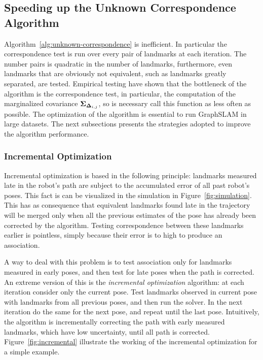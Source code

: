 \subsection{Speeding up the Unknown Correspondence Algorithm}

Algorithm~\ref{alg:unknown-correspondence} is inefficient. In particular the correspondence test is run over every pair of landmarks at each iteration. The number pairs is quadratic in the number of landmarks, furthermore, even landmarks that are obviously not equivalent, such as landmarks greatly separated, are tested. Empirical testing have shown that the bottleneck of the algorithm is the correspondence test, in particular, the computation of the marginalized covariance $\boldsymbol{\Sigma}_{\boldsymbol{\Delta}_{i,j}}$, so is necessary call this function as less often as possible. The optimization of the algorithm is essential to run GraphSLAM in large datasets. The next subsections presents the strategies adopted to improve the algorithm performance.

\subsubsection{Incremental Optimization}

Incremental optimization is based in the following principle: landmarks measured late in the robot's path are subject to the accumulated error of all past robot's poses. This fact is can be visualized in the simulation in Figure~\ref{fig:simulation}. This has as consequence that equivalent landmarks found late in the trajectory will be merged only when all the previous estimates of the pose has already been corrected by the algorithm. Testing correspondence between these landmarks earlier is pointless, simply because their error is to high to produce an association. 

A way to deal with this problem is to test association only for landmarks measured in early poses, and then test for late poses when the path is corrected. An extreme version of this is the \emph{incremental optimization} algorithm: at each iteration consider only the current pose. Test landmarks observed in current pose with landmarks from all previous poses, and then run the solver. In the next iteration do the same for the next pose, and repeat until the last pose. Intuitively, the algorithm is incrementally correcting the path with early measured landmarks, which have low uncertainty, until all path is corrected. Figure~\ref{fig:incremental} illustrate the working of the incremental optimization for a simple example.

